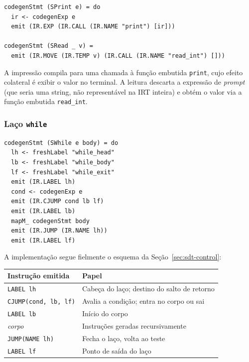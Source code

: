 \begin{verbatim}
codegenStmt (SPrint e) = do
  ir <- codegenExp e
  emit (IR.EXP (IR.CALL (IR.NAME "print") [ir]))

codegenStmt (SRead _ v) =
  emit (IR.MOVE (IR.TEMP v) (IR.CALL (IR.NAME "read_int") []))
\end{verbatim}

A impressão compila para uma chamada à função embutida \texttt{print}, cujo
efeito colateral é exibir o valor no terminal.
A leitura descarta a expressão de \emph{prompt} (que seria uma string, não
representável na IRT inteira) e obtém o valor via a função embutida
\texttt{read\_int}.

\subsubsection*{Laço \texttt{while}}

\begin{verbatim}
codegenStmt (SWhile e body) = do
  lh <- freshLabel "while_head"
  lb <- freshLabel "while_body"
  lf <- freshLabel "while_exit"
  emit (IR.LABEL lh)
  cond <- codegenExp e
  emit (IR.CJUMP cond lb lf)
  emit (IR.LABEL lb)
  mapM_ codegenStmt body
  emit (IR.JUMP (IR.NAME lh))
  emit (IR.LABEL lf)
\end{verbatim}

A implementação segue fielmente o esquema da Seção~\ref{sec:sdt-control}:

\begin{center}
  \renewcommand{\arraystretch}{1.2}
  \begin{tabular}{ll}
    \toprule
    Instrução emitida & Papel \\
    \midrule
    \texttt{LABEL lh}            & Cabeça do laço; destino do salto
    de retorno \\
    \texttt{CJUMP(cond, lb, lf)} & Avalia a condição; entra no corpo ou sai \\
    \texttt{LABEL lb}            & Início do corpo \\
    \textit{corpo}               & Instruções geradas recursivamente \\
    \texttt{JUMP(NAME lh)}       & Fecha o laço, volta ao teste \\
    \texttt{LABEL lf}            & Ponto de saída do laço \\
    \bottomrule
  \end{tabular}
\end{center}

